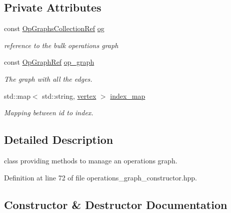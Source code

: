 \subsection*{Private Attributes}
\begin{DoxyCompactItemize}
\item 
const \hyperlink{op__graph_8hpp_a6a9918dc96f448814ad35759f9460ed7}{Op\+Graphs\+Collection\+Ref} \hyperlink{classoperations__graph__constructor_a2284a108ba3d16eac3a2457b5a0cbb94}{og}
\begin{DoxyCompactList}\small\item\em reference to the bulk operations graph \end{DoxyCompactList}\item 
const \hyperlink{op__graph_8hpp_aee97c95c40f791b60c451d9e29c72d39}{Op\+Graph\+Ref} \hyperlink{classoperations__graph__constructor_ac551692bc712bd66469a7e594c80344f}{op\+\_\+graph}
\begin{DoxyCompactList}\small\item\em The graph with all the edges. \end{DoxyCompactList}\item 
std\+::map$<$ std\+::string, \hyperlink{graph_8hpp_abefdcf0544e601805af44eca032cca14}{vertex} $>$ \hyperlink{classoperations__graph__constructor_a3ed7eebc25cfebe417df7c695340c866}{index\+\_\+map}
\begin{DoxyCompactList}\small\item\em Mapping between id to index. \end{DoxyCompactList}\end{DoxyCompactItemize}


\subsection{Detailed Description}
class providing methods to manage an operations graph. 

Definition at line 72 of file operations\+\_\+graph\+\_\+constructor.\+hpp.



\subsection{Constructor \& Destructor Documentation}
\mbox{\label{classoperations__graph__constructor_a3158fc69235da451a4a7397302d12f82}} 
